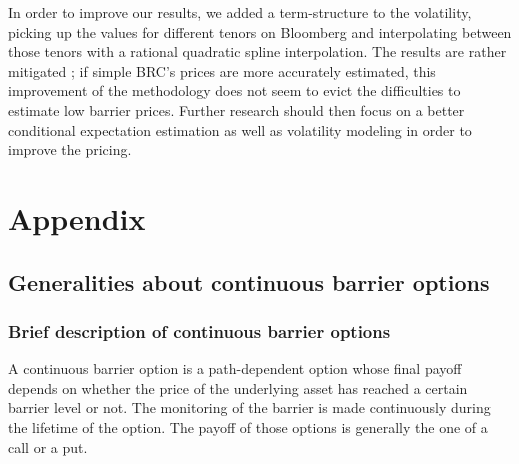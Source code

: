 \documentclass[a4paper,11pt,english]{book}
\let\cleardoublepage\clearpage
\begin{document}
In order to improve our results, we added a term-structure to the volatility, picking up the values for different tenors on Bloomberg and interpolating between those tenors with a rational quadratic spline interpolation. The results are rather mitigated ; if simple BRC's prices are more accurately estimated, this improvement of the methodology does not seem to evict the difficulties to estimate low barrier prices. Further research should then focus on a better conditional expectation estimation as well as volatility modeling in order to improve the pricing.




\newpage
\nocite{*}






\newpage
\begingroup
\let\clearpage\relax
\let\cleardoublepage\relax


\renewcommand{\thesection}{\Alph{section}}
\chapter*{Appendix}
\appendix
{}

\section{Generalities about continuous barrier options}
\label{appendix:down-in-put}

\subsection{Brief description of continuous barrier options}
A continuous barrier option is a path-dependent option whose final payoff depends on whether the price of the underlying asset has reached a certain barrier level or not. The monitoring of the barrier is made continuously during the lifetime of the option. The payoff of those options is generally the one of a call or a put.\\
\end{document}
